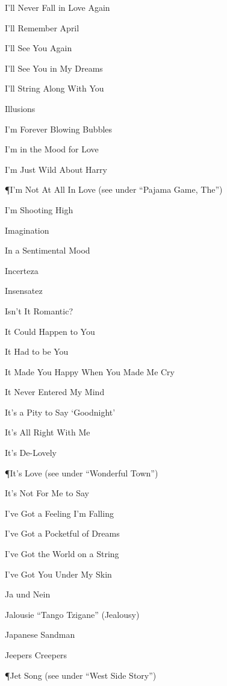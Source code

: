 \N I'll Never Fall in Love Again

\N I'll Remember April

\N I'll See You Again

\N I'll See You in My Dreams

\N I'll String Along With You

\N Illusions

\N I'm Forever Blowing Bubbles

\N {}

\N I'm in the Mood for Love

\N I'm Just Wild About Harry

\P I'm Not At All In Love
\nobreak
\T (see under ``Pajama Game, The'')

\N I'm Shooting High

\N Imagination

\N In a Sentimental Mood

\N Incerteza

\N Insensatez

\N Isn't It Romantic?

\N {}

\N It Could Happen to You

\N It Had to be You

\N It Made You Happy When You Made Me Cry

\N It Never Entered My Mind

\N It's a Pity to Say `Goodnight'

\N It's All Right With Me

\N It's De-Lovely

\P It's Love
\nobreak
\T (see under ``Wonderful Town'')

\N It's Not For Me to Say

\N I've Got a Feeling I'm Falling

\N I've Got a Pocketful of Dreams

\N I've Got the World on a String

\N I've Got You Under My Skin

\N Ja und Nein

\N Jalousie ``Tango Tzigane'' (Jealousy)

\N Japanese Sandman

\N Jeepers Creepers

\P Jet Song
\nobreak
\T (see under ``West Side Story'')

